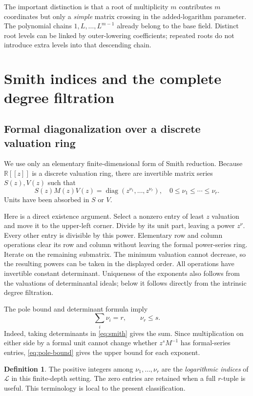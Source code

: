 \documentclass[11pt,a4paper]{article}
\numberwithin{equation}{section}
\theoremstyle{definition}
\newtheorem{definition}[theorem]{Definition}
\theoremstyle{remark}
\theoremstyle{definition}
\newcommand{\R}{\mathbb R}
\newcommand{\Ll}{\mathcal L}
\newcommand{\diag}{\operatorname{diag}}
\begin{document}
The important distinction is that a root of multiplicity $m$ contributes $m$ coordinates but only a \emph{simple} matrix crossing in the added-logarithm parameter. The polynomial chains $1,L,\ldots,L^{m-1}$ already belong to the base field. Distinct root levels can be linked by outer-lowering coefficients; repeated roots do not introduce extra levels into that descending chain.

\section{Smith indices and the complete degree filtration}
\label{sec:smith}

\subsection{Formal diagonalization over a discrete valuation ring}
We use only an elementary finite-dimensional form of Smith reduction. Because $\R[[z]]$ is a discrete valuation ring, there are invertible matrix series $S(z),V(z)$ such that
\begin{equation}
 S(z)M(z)V(z)=\diag(z^{\nu_1},\ldots,z^{\nu_r}),
 \quad 0\le\nu_1\le\cdots\le\nu_r.
 \label{eq:smith}
\end{equation}
Units have been absorbed in $S$ or $V$.

Here is a direct existence argument. Select a nonzero entry of least $z$ valuation and move it to the upper-left corner. Divide by its unit part, leaving a power $z^\nu$. Every other entry is divisible by this power. Elementary row and column operations clear its row and column without leaving the formal power-series ring. Iterate on the remaining submatrix. The minimum valuation cannot decrease, so the resulting powers can be taken in the displayed order. All operations have invertible constant determinant. Uniqueness of the exponents also follows from the valuations of determinantal ideals; below it follows directly from the intrinsic degree filtration.

The pole bound and determinant formula imply
\begin{equation}
 \sum_i\nu_i=r,\qquad \nu_r\le s.
 \label{eq:smith-bounds}
\end{equation}
Indeed, taking determinants in \eqref{eq:smith} gives the sum. Since multiplication on either side by a formal unit cannot change whether $z^sM^{-1}$ has formal-series entries, \eqref{eq:pole-bound} gives the upper bound for each exponent.

\begin{definition}
The positive integers among $\nu_1,\ldots,\nu_r$ are the \emph{logarithmic indices} of $\Ll$ in this finite-depth setting. The zero entries are retained when a full $r$-tuple is useful. This terminology is local to the present classification.
\end{definition}
\end{document}

